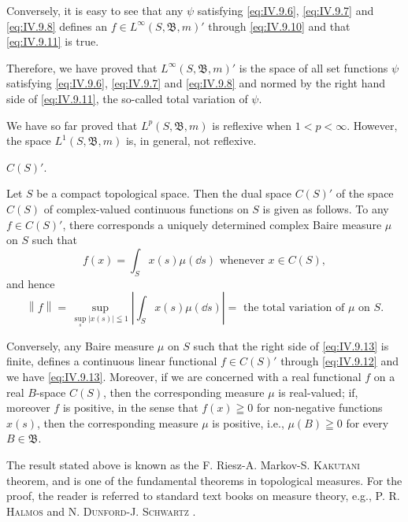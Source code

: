 Conversely, it is easy to see that any $\psi$ satisfying \eqref{eq:IV.9.6}, \eqref{eq:IV.9.7} and \eqref{eq:IV.9.8} defines an $f \in L^{\infty}(S, \mathfrak{B}, m)'$ through \eqref{eq:IV.9.10} and that \eqref{eq:IV.9.11} is true. 

Therefore, we have proved that $L^{\infty}(S,\mathfrak{B},m)'$ is the space of all set functions $\psi$ satisfying \eqref{eq:IV.9.6}, \eqref{eq:IV.9.7} and \eqref{eq:IV.9.8} and normed by the right hand side of \eqref{eq:IV.9.11}, the so-called total variation of $\psi$. 

\begin{remarku} We have so far proved that $L^p(S, \mathfrak{B}, m)$ is reflexive when $1 < p < \infty$. However, the space $L^1(S, \mathfrak{B}, m)$ is, in general, not reflexive. 
\end{remarku}

\begin{example}\label{ex:IV.9.Example.6} $C(S)'$.
\end{example}

Let $S$ be a compact topological space. Then the dual space $C(S)'$ of the space $C(S)$ of complex-valued continuous functions on $S$ is given as follows. To any $f \in C(S)'$, there corresponds a uniquely determined complex Baire measure $\mu$ on $S$ such that 
\begin{equation}\label{eq:IV.9.12}
f (x) = \int_{S} x (s) \mu (\dd s) \text{ whenever } x \in C (S),
\end{equation}
and hence 
\begin{equation}\label{eq:IV.9.13}
\left\| f \right\| = \sup\limits _ {\sup\limits _{s} | x (s) | \leqq 1} \left| \int_{S} x (s) \mu (\dd s) \right| = \text{ the total variation of } \mu \text{ on } S.
\end{equation}

Conversely, any Baire measure $\mu$ on $S$ such that the right side of \eqref{eq:IV.9.13} is finite, defines a continuous linear functional $f \in C(S)'$ through \eqref{eq:IV.9.12} and we have \eqref{eq:IV.9.13}. Moreover, if we are concerned with a real functional $f$ on a real $B$-space $C(S)$, then the corresponding measure $\mu$ is real-valued; if, moreover $f$ is positive, in the sense that $f(x) \geqq 0$ for non-negative functions $x(s)$, then the corresponding measure $\mu$ is positive, i.e., $\mu(B) \geqq 0$ for every $B \in \mathfrak{B}$. 

\begin{remarku} The result stated above is known as the F. Riesz-A. Markov-S. \textsc{Kakutani} theorem, and is one of the fundamental theorems in topological measures. For the proof, the reader is referred to standard text books on measure theory, e.g., P. R. \textsc{Halmos} \cite{halmos92} and N. \textsc{Dunford}-J. \textsc{Schwartz} \cite{dunford44}. 
\end{remarku}

